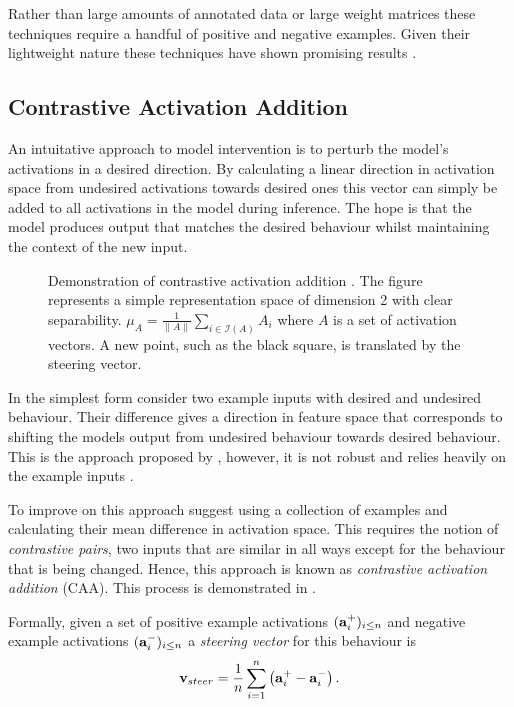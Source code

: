 Rather than large amounts of annotated data or large weight matrices these techniques require a handful of positive and negative examples.
Given their lightweight nature these techniques have shown promising results \citep{steering-taxonomy, steering-theory, steering-clear, reft}.

\subsection{Contrastive Activation Addition}
\label{caa}

An intuitative approach to model intervention is to perturb the model's activations in a desired direction.
By calculating a linear direction in activation space from undesired activations towards desired ones this vector can simply be added to all activations in the model during inference.
The hope is that the model produces output that matches the desired behaviour whilst maintaining the context of the new input.

\begin{figure}
    \centering
    \captionsetup{width=.9\textwidth}
    
\caption{Demonstration of contrastive activation addition \citep{caa}. The figure represents a simple representation space of dimension 2 with clear separability. $\mu_A = \frac{1}{\|A\|}\sum_{i \in \mathcal{I}(A)} A_i$ where $A$ is a set of activation vectors. A new point, such as the black square, is translated by the steering vector.}
    \label{fig:caa}
\end{figure}

In the simplest form consider two example inputs with desired and undesired behaviour.
Their difference gives a direction in feature space that corresponds to shifting the models output from undesired behaviour towards desired behaviour.
This is the approach proposed by \citet{activation-addition}, however, it is not robust and relies heavily on the example inputs \citep{caa}.

To improve on this approach \citet{caa} suggest using a collection of examples and calculating their mean difference in activation space.
This requires the notion of \textit{contrastive pairs}, two inputs that are similar in all ways except for the behaviour that is being changed.
Hence, this approach is known as \textit{contrastive activation addition} (CAA).
This process is demonstrated in .

Formally, given a set of positive example activations $(\mathbf{a}_i^+)_{i\le n}$ and negative example activations $(\mathbf{a}_i^-)_{i\le n}$ a \textit{steering vector} for this behaviour is
\[\mathbf{v}_{steer} = \frac{1}{n}\sum_{i=1}^{n}\left(\mathbf{a}_i^+ - \mathbf{a}_i^-\right).\]

